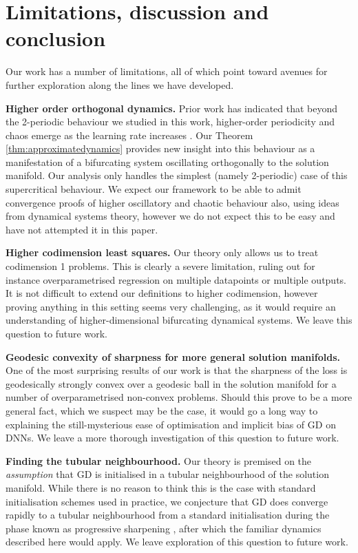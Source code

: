 \documentclass{article}
\newcommand{\myparagraph}[1]{\noindent\textbf{#1.}}
\theoremstyle{plain}
\theoremstyle{definition}
\theoremstyle{remark}
\begin{document}
\section{Limitations, discussion and conclusion}

Our work has a number of limitations, all of which point toward avenues for further exploration along the lines we have developed.

\myparagraph{Higher order orthogonal dynamics} Prior work has indicated that beyond the 2-periodic behaviour we studied in this work, higher-order periodicity and chaos emerge as the learning rate increases \cite{kalraeos}. Our Theorem \ref{thm:approximatedynamics} provides new insight into this behaviour as a manifestation of a bifurcating system oscillating orthogonally to the solution manifold. Our analysis only handles the simplest (namely 2-periodic) case of this supercritical behaviour. We expect our framework to be able to admit convergence proofs of higher oscillatory and chaotic behaviour also, using ideas from dynamical systems theory, however we do not expect this to be easy and have not attempted it in this paper.

\myparagraph{Higher codimension least squares} Our theory only allows us to treat codimension 1 problems. This is clearly a severe limitation, ruling out for instance overparametrised regression on multiple datapoints or multiple outputs. It is not difficult to extend our definitions to higher codimension, however proving anything in this setting seems very challenging, as it would require an understanding of higher-dimensional bifurcating dynamical systems. We leave this question to future work.

\myparagraph{Geodesic convexity of sharpness for more general solution manifolds} One of the most surprising results of our work is that the sharpness of the loss is geodesically strongly convex over a geodesic ball in the solution manifold for a number of overparametrised non-convex problems. Should this prove to be a more general fact, which we suspect may be the case, it would go a long way to explaining the still-mysterious ease of optimisation and implicit bias of GD on DNNs. We leave a more thorough investigation of this question to future work.

\myparagraph{Finding the tubular neighbourhood} Our theory is premised on the \emph{assumption} that GD is initialised in a tubular neighbourhood of the solution manifold. While there is no reason to think this is the case with standard initialisation schemes used in practice, we conjecture that GD does converge rapidly to a tubular neighbourhood from a standard initialisation during the phase known as progressive sharpening \cite{coheneos}, after which the familiar dynamics described here would apply. We leave exploration of this question to future work.
\end{document}
